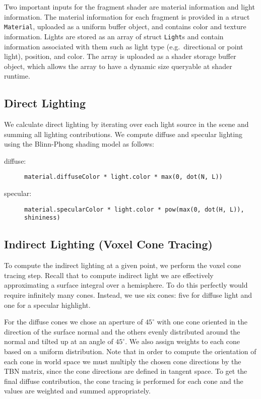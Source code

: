 Two important inputs for the fragment shader are material information and light information. The material information for each fragment is provided in a struct \texttt{Material}, uploaded as a uniform buffer object, and contains color and texture information. Lights are stored as an array of struct \texttt{Light}s and contain information associated with them such as light type (e.g.\ directional or point light), position, and color. The array is uploaded as a shader storage buffer object, which allows the array to have a dynamic size queryable at shader runtime.

\subsection{Direct Lighting}
We calculate direct lighting by iterating over each light source in the scene and summing all lighting contributions. We compute diffuse and specular lighting using the Blinn-Phong shading model as follows:
\begin{description}
    \item[diffuse:] \texttt{material.diffuseColor * light.color * max(0, dot(N, L))}
    \item[specular:] \texttt{material.specularColor * light.color * pow(max(0, dot(H, L)), shininess)}
\end{description}

\subsection{Indirect Lighting (Voxel Cone Tracing)}
To compute the indirect lighting at a given point, we perform the voxel cone tracing step. Recall that to compute indirect light we are effectively approximating a surface integral over a hemisphere. To do this perfectly would require infinitely many cones. Instead, we use six cones: five for diffuse light and one for a specular highlight.

For the diffuse cones we chose an aperture of $45^\circ$ with one cone oriented in the direction of the surface normal and the others evenly distributed around the normal and tilted up at an angle of $45^\circ$. We also assign weights to each cone based on a uniform distribution. Note that in order to compute the orientation of each cone in world space we must multiply the chosen cone directions by the TBN matrix, since the cone directions are defined in tangent space. To get the final diffuse contribution, the cone tracing is performed for each cone and the values are weighted and summed appropriately.

